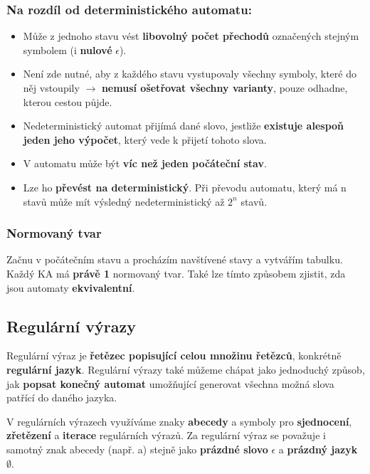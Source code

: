 \subsubsection*{Na rozdíl od deterministického automatu:}
\begin{itemize}
	\item Může z jednoho stavu vést \textbf{libovolný počet přechodů} označených stejným symbolem (i \textbf{nulové} $\epsilon$). 
	\item Není zde nutné, aby z každého stavu vystupovaly všechny symboly, které do něj vstoupily $\rightarrow$ \textbf{nemusí ošetřovat všechny varianty}, pouze odhadne, kterou cestou půjde.
	\item Nedeterministický automat přijímá dané slovo, jestliže \textbf{existuje alespoň jeden jeho výpočet}, který vede k přijetí tohoto slova.
	\item V automatu může být \textbf{víc než jeden počáteční stav}.
	\item Lze ho \textbf{převést na deterministický}. Při převodu automatu, který má n stavů může mít výsledný nedeterministický až $2^n$ stavů.
\end{itemize}


\subsubsection{Normovaný tvar}
Začnu v počátečním stavu a procházím navštívené stavy a vytvářím tabulku. Každý KA má \textbf{právě 1} normovaný tvar. Také lze tímto způsobem zjistit, zda jsou automaty \textbf{ekvivalentní}.


\subsection{Regulární výrazy}
Regulární výraz je \textbf{řetězec popisující celou množinu řetězců}, konkrétně \textbf{regulární jazyk}. Regulární výrazy také můžeme chápat jako jednoduchý způsob, jak \textbf{popsat konečný automat} umožňující generovat všechna možná slova patřící do daného jazyka. 

V regulárních výrazech využíváme znaky \textbf{abecedy} a symboly pro \textbf{sjednocení}, \textbf{zřetězení} a \textbf{iterace} regulárních výrazů. Za regulární výraz se považuje i samotný znak abecedy (např. a) stejně jako \textbf{prázdné slovo} $\epsilon$ a \textbf{prázdný jazyk} $\emptyset$.

